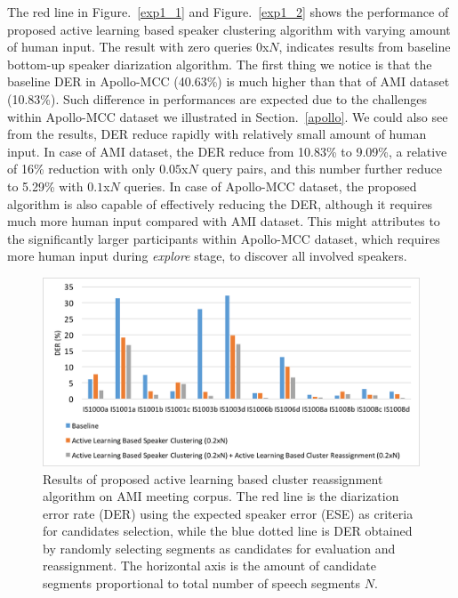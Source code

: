 \documentclass[journal]{IEEEtran}
\begin{document}
The red line in Figure.~\ref{exp1_1} and Figure.~\ref{exp1_2} shows the performance of proposed active learning based speaker clustering algorithm with varying amount of human input. The result with zero queries $0$x$N$, indicates results from baseline bottom-up speaker diarization algorithm. The first thing we notice is that the baseline DER in Apollo-MCC (40.63\%) is much higher than that of AMI dataset (10.83\%). Such difference in performances are expected due to the challenges within Apollo-MCC dataset we illustrated in Section.~\ref{apollo}. We could also see from the results, DER reduce rapidly with relatively small amount of human input. In case of AMI dataset, the DER reduce from 10.83\% to 9.09\%, a relative of 16\% reduction with only $0.05$x$N$ query pairs, and this number further reduce to 5.29\% with $0.1$x$N$ queries. In case of Apollo-MCC dataset, the proposed algorithm is also capable of effectively reducing the DER, although it requires much more human input compared with AMI dataset. This might attributes to the significantly larger participants within Apollo-MCC dataset, which requires more human input during \textit{explore} stage, to discover all involved speakers. 

\begin{figure}[h]
	\centering
	\includegraphics[width=0.75\linewidth]{figs/exp3_1}
	\caption{Results of proposed active learning based cluster reassignment algorithm on AMI meeting corpus. The red line is the diarization error rate (DER) using the expected speaker error (ESE) as criteria for candidates selection, while the blue dotted line is DER obtained by randomly selecting segments as candidates for evaluation and reassignment. The horizontal axis is the amount of candidate segments proportional to total number of speech segments $N$.}
	\label{exp2_1}
\end{figure}
\end{document}
